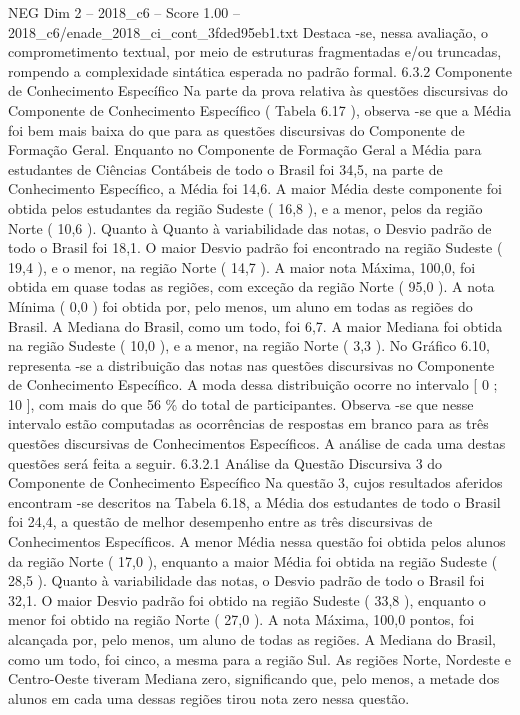 \begin{textsample}{NEG Dim 2 – 2018\_c6 – Score 1.00 – 2018\_c6/enade\_2018\_ci\_cont\_3fded95eb1.txt}
Destaca -se, nessa avaliação, o comprometimento textual, por meio de estruturas fragmentadas e/ou truncadas, rompendo a complexidade sintática esperada no padrão formal. 6.3.2 Componente de Conhecimento Específico Na parte da prova relativa às questões discursivas do Componente de Conhecimento Específico ( Tabela 6.17 ), observa -se que a Média foi bem mais baixa do que para as questões discursivas do Componente de Formação Geral.
Enquanto no Componente de Formação Geral a Média para estudantes de Ciências Contábeis de todo o Brasil foi 34,5, na parte de Conhecimento Específico, a Média foi 14,6.
A maior Média deste componente foi obtida pelos estudantes da região Sudeste ( 16,8 ), e a menor, pelos da região Norte ( 10,6 ).
Quanto à Quanto à variabilidade das notas, o Desvio padrão de todo o Brasil foi 18,1.
O maior Desvio padrão foi encontrado na região Sudeste ( 19,4 ), e o menor, na região Norte ( 14,7 ).
A maior nota Máxima, 100,0, foi obtida em quase todas as regiões, com exceção da região Norte ( 95,0 ).
A nota Mínima ( 0,0 ) foi obtida por, pelo menos, um aluno em todas as regiões do Brasil.
A Mediana do Brasil, como um todo, foi 6,7.
A maior Mediana foi obtida na região Sudeste ( 10,0 ), e a menor, na região Norte ( 3,3 ).
No Gráfico 6.10, representa -se a distribuição das notas nas questões discursivas no Componente de Conhecimento Específico.
A moda dessa distribuição ocorre no intervalo [ 0 ; 10 ], com mais do que 56 \% do total de participantes.
Observa -se que nesse intervalo estão computadas as ocorrências de respostas em branco para as três questões discursivas de Conhecimentos Específicos.
A análise de cada uma destas questões será feita a seguir. 6.3.2.1 Análise da Questão Discursiva 3 do Componente de Conhecimento Específico Na questão 3, cujos resultados aferidos encontram -se descritos na Tabela 6.18, a Média dos estudantes de todo o Brasil foi 24,4, a questão de melhor desempenho entre as três discursivas de Conhecimentos Específicos.
A menor Média nessa questão foi obtida pelos alunos da região Norte ( 17,0 ), enquanto a maior Média foi obtida na região Sudeste ( 28,5 ).
Quanto à variabilidade das notas, o Desvio padrão de todo o Brasil foi 32,1.
O maior Desvio padrão foi obtido na região Sudeste ( 33,8 ), enquanto o menor foi obtido na região Norte ( 27,0 ).
A nota Máxima, 100,0 pontos, foi alcançada por, pelo menos, um aluno de todas as regiões.
A Mediana do Brasil, como um todo, foi cinco, a mesma para a região Sul.
As regiões Norte, Nordeste e Centro-Oeste tiveram Mediana zero, significando que, pelo menos, a metade dos alunos em cada uma dessas regiões tirou nota zero nessa questão.

\end{textsample}

